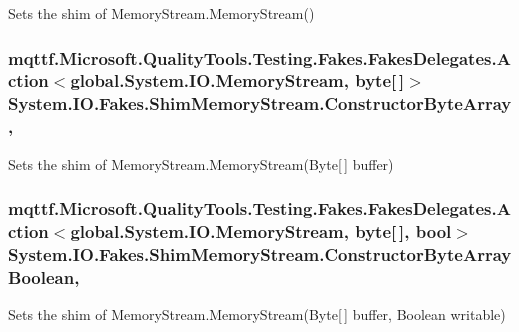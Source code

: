 Sets the shim of Memory\-Stream.\-Memory\-Stream()

\hypertarget{class_system_1_1_i_o_1_1_fakes_1_1_shim_memory_stream_ab37a949a65195a6ef387835657ffaeff}{
\subsubsection[{Constructor\-Byte\-Array}]{\setlength{\rightskip}{0pt plus 5cm}mqttf.\-Microsoft.\-Quality\-Tools.\-Testing.\-Fakes.\-Fakes\-Delegates.\-Action$<$global.\-System.\-I\-O.\-Memory\-Stream, byte\mbox{[}$\,$\mbox{]}$>$ System.\-I\-O.\-Fakes.\-Shim\-Memory\-Stream.\-Constructor\-Byte\-Array\hspace{0.3cm}{\ttfamily [static]}, {\ttfamily [set]}}}\label{class_system_1_1_i_o_1_1_fakes_1_1_shim_memory_stream_ab37a949a65195a6ef387835657ffaeff}


Sets the shim of Memory\-Stream.\-Memory\-Stream(\-Byte\mbox{[}$\,$\mbox{]} buffer)

\hypertarget{class_system_1_1_i_o_1_1_fakes_1_1_shim_memory_stream_a96787ae0f69121cbe7b1ed0a0b154cd7}{
\subsubsection[{Constructor\-Byte\-Array\-Boolean}]{\setlength{\rightskip}{0pt plus 5cm}mqttf.\-Microsoft.\-Quality\-Tools.\-Testing.\-Fakes.\-Fakes\-Delegates.\-Action$<$global.\-System.\-I\-O.\-Memory\-Stream, byte\mbox{[}$\,$\mbox{]}, bool$>$ System.\-I\-O.\-Fakes.\-Shim\-Memory\-Stream.\-Constructor\-Byte\-Array\-Boolean\hspace{0.3cm}{\ttfamily [static]}, {\ttfamily [set]}}}\label{class_system_1_1_i_o_1_1_fakes_1_1_shim_memory_stream_a96787ae0f69121cbe7b1ed0a0b154cd7}


Sets the shim of Memory\-Stream.\-Memory\-Stream(\-Byte\mbox{[}$\,$\mbox{]} buffer, Boolean writable)

